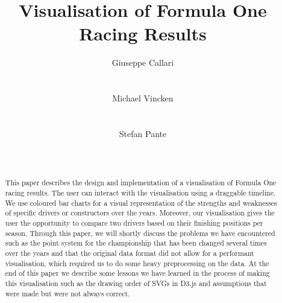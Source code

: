 \documentclass{sigchi}
\begin{document}
\title{Visualisation of Formula One Racing Results}

\author{
  \alignauthor Giuseppe Callari\\
    \\
    \\
  \alignauthor Michael Vincken\\
    \\
    \\
  \alignauthor Stefan Pante\\
    \\
    \\
}

\maketitle

\begin{abstract}
This paper describes the design and implementation of a visualisation of Formula One racing results. The user can interact with the visualisation using a draggable timeline. We use coloured bar charts for a visual representation of the strengths and weaknesses of specific drivers or constructors over the years. Moreover, our visualisation gives the user the opportunity to compare two drivers based on their finishing positions per season. Through this paper, we will shortly discuss the problems we have encountered such as the point system for the championship that has been changed several times over the years and that the original data format did not allow for a performant visualisation, which required us to do some heavy preprocessing on the data. At the end of this paper we describe some lessons we have learned in the process of making this visualisation such as the drawing order of SVGs in D3.js and assumptions that were made but were not always correct.

\end{abstract}


\end{document}
